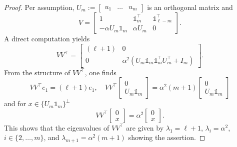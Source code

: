 \documentclass[10pt,a4paper]{amsart}
\newcommand{\dd}{\ell}
\newcommand{\one}{\mathds{1}}
\begin{document}
\begin{proof}
    Per assumption, $U_m:=\begin{bmatrix}
        u_1 & \dots &u_{m}
    \end{bmatrix}$ is an orthogonal matrix and
    \begin{equation}\nonumber
     V=\begin{bmatrix}
         1 & \one_{m}^\top & \one_{\dd-m}^\top\\
         -\alpha U_m\one_m & \alpha U_m & 0
     \end{bmatrix}.
    \end{equation}
    A direct computation yields
    \begin{equation}\nonumber
         VV^\top = \begin{bmatrix}
            (\dd+1) & 0\\0 & \alpha^2 (U_m\one_m \one_m^\top U_m^\top + I_m)
        \end{bmatrix}.
    \end{equation}
    From the structure of $VV^\top\!$, one finds
    \begin{equation}\nonumber
        VV^\top e_1 = (\dd+1)e_1, \quad VV^\top \begin{bmatrix}
            0\\ U_m\one_m
        \end{bmatrix} = \alpha^2(m+1) \begin{bmatrix}
            0\\ U_m\one_m
        \end{bmatrix}
    \end{equation}
    and for $x\in \{U_m\one_m\}^\bot$ 
    \begin{equation}\nonumber
        VV^\top \begin{bmatrix}
            0\\ x
        \end{bmatrix} = \alpha^2 \begin{bmatrix}
            0\\ x
        \end{bmatrix}.
    \end{equation}
    This shows that the eigenvalues of $VV^\top$ are given by $\lambda_1=\dd+1$, $\lambda_i = \alpha^2$, $i \in \{2,\ldots,m\}$, and $\lambda_{m+1} = \alpha^2(m+1)$ showing the assertion.
\end{proof}
\end{document}
